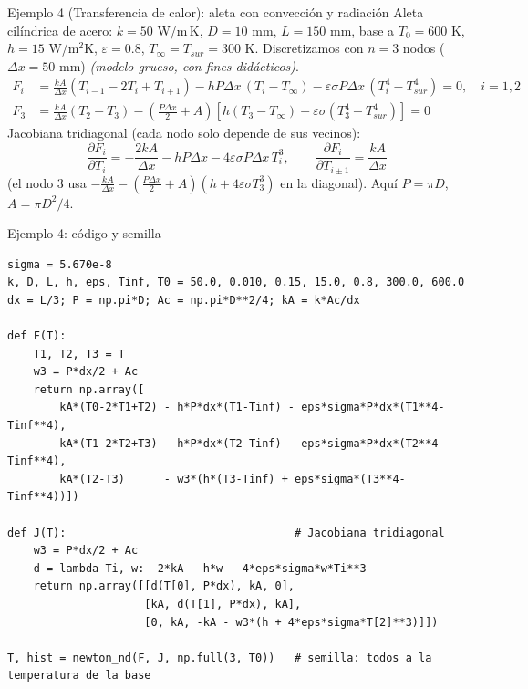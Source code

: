 \documentclass[aspectratio=169,11pt]{beamer}
\begin{document}
\begin{frame}{Ejemplo 4 (Transferencia de calor): aleta con convección y radiación}
  Aleta cilíndrica de acero: $k=50$ W/m\,K, $D=10$ mm, $L=150$ mm, base a $T_0=600$ K, $h=15$ W/m$^2$K, $\varepsilon=0.8$, $T_\infty=T_{sur}=300$ K. Discretizamos con $n=3$ nodos ($\Delta x=50$ mm) \textit{(modelo grueso, con fines didácticos)}.
  \small
  \begin{align*}
    F_i&=\frac{kA}{\Delta x}(T_{i-1}-2T_i+T_{i+1})-hP\Delta x\,(T_i-T_\infty)-\varepsilon\sigma P\Delta x\,(T_i^4-T_{sur}^4)=0,\quad i=1,2\\
    F_3&=\frac{kA}{\Delta x}(T_2-T_3)-\left(\tfrac{P\Delta x}{2}+A\right)\left[h(T_3-T_\infty)+\varepsilon\sigma(T_3^4-T_{sur}^4)\right]=0
  \end{align*}
  Jacobiana \alert{tridiagonal} (cada nodo solo depende de sus vecinos):
  \[
    \frac{\partial F_i}{\partial T_i}=-\frac{2kA}{\Delta x}-hP\Delta x-4\varepsilon\sigma P\Delta x\,T_i^3,\qquad
    \frac{\partial F_i}{\partial T_{i\pm1}}=\frac{kA}{\Delta x}
  \]
  (el nodo 3 usa $-\frac{kA}{\Delta x}-(\frac{P\Delta x}{2}+A)(h+4\varepsilon\sigma T_3^3)$ en la diagonal). Aquí $P=\pi D$, $A=\pi D^2/4$.
\end{frame}

\begin{frame}[fragile]{Ejemplo 4: código y semilla}
\begin{lstlisting}
sigma = 5.670e-8
k, D, L, h, eps, Tinf, T0 = 50.0, 0.010, 0.15, 15.0, 0.8, 300.0, 600.0
dx = L/3; P = np.pi*D; Ac = np.pi*D**2/4; kA = k*Ac/dx

def F(T):
    T1, T2, T3 = T
    w3 = P*dx/2 + Ac
    return np.array([
        kA*(T0-2*T1+T2) - h*P*dx*(T1-Tinf) - eps*sigma*P*dx*(T1**4-Tinf**4),
        kA*(T1-2*T2+T3) - h*P*dx*(T2-Tinf) - eps*sigma*P*dx*(T2**4-Tinf**4),
        kA*(T2-T3)      - w3*(h*(T3-Tinf) + eps*sigma*(T3**4-Tinf**4))])

def J(T):                                   # Jacobiana tridiagonal
    w3 = P*dx/2 + Ac
    d = lambda Ti, w: -2*kA - h*w - 4*eps*sigma*w*Ti**3
    return np.array([[d(T[0], P*dx), kA, 0],
                     [kA, d(T[1], P*dx), kA],
                     [0, kA, -kA - w3*(h + 4*eps*sigma*T[2]**3)]])

T, hist = newton_nd(F, J, np.full(3, T0))   # semilla: todos a la temperatura de la base
\end{lstlisting}
\end{frame}
\end{document}
